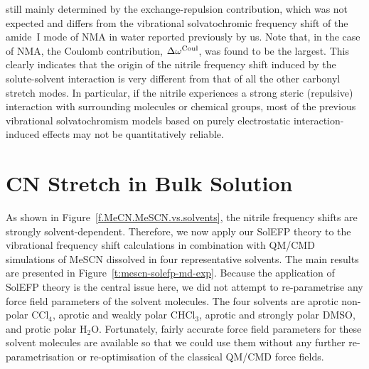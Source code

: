 \documentclass[b5paper,oneside,fleqn,11pt]{book}
\begin{document}
\begin{refsection}
still mainly determined by the exchange\hyp{}repulsion
contribution, which was not expected and differs from the
vibrational solvatochromic frequency shift of the amide~I mode
of NMA in water reported previously by us. \citep{Blasiak.Cho.JCP.2014,Blasiak.Cho.JCP.2015} 
Note that, in
the case of NMA, the Coulomb contribution, $\Delta\omega^{\rm Coul}$, was found
to be the largest. This clearly indicates that the origin of the
nitrile frequency shift induced by the solute\hyp{}solvent
interaction is very different from that of all the other carbonyl
stretch modes. In particular, if the nitrile experiences a strong
steric (repulsive) interaction with surrounding molecules or
chemical groups, most of the previous vibrational
solvatochromism models based on purely electrostatic
interaction\hyp{}induced effects may not be quantitatively reliable.



\section{CN Stretch in Bulk Solution\label{s:dw-cn-bulk}}

As shown in Figure~\ref{f.MeCN.MeSCN.vs.solvents}, 
the nitrile frequency shifts are strongly
solvent\hyp{}dependent. Therefore, we now apply our SolEFP
theory to the vibrational frequency shift calculations in
combination with QM/CMD simulations of MeSCN dissolved in four
representative solvents. The main results are presented in
Figure~\ref{t:mescn-solefp-md-exp}. Because the application of SolEFP 
theory is the central
issue here, we did not attempt to re\hyp{}parametrise any force
field parameters of the solvent molecules. The four solvents
are aprotic non\hyp{}polar CCl$_4$, aprotic and weakly polar CHCl$_3$,
aprotic and strongly polar DMSO, and protic polar H$_2$O.
Fortunately, fairly accurate force field parameters for these
solvent molecules are available so that we could use them
without any further re\hyp{}parametrisation or re\hyp{}optimisation of
the classical QM/CMD force fields.


\end{refsection}
\end{document}
